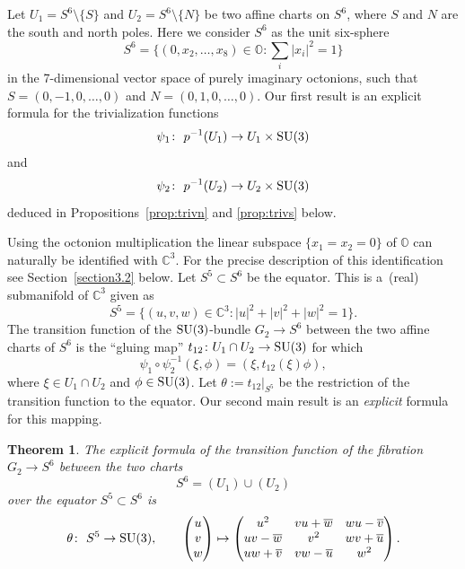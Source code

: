 \documentclass[pdftex]{sigma}
\numberwithin{equation}{section}
\newtheorem{Theorem}{Theorem}[section]
\begin{document}
Let $U_1 = S^6{\setminus}\{ S \}$ and $U_2 = S^6{\setminus}\{ N \}$ be two affine charts on $S^6$, where $S$ and $N$ are the south and north poles. Here we consider $S^6$ as the unit six-sphere
\[ S^6=\bigg\{(0,x_2,\dots,x_8) \in \mathbb{O}\colon \sum_i|x_i|^2=1 \bigg\}\]
in the 7-dimensional vector space of purely imaginary octonions, such that $S=(0,-1,0,\dots,0)$ and $N=(0,1,0,\dots,0)$. Our first result is
an explicit formula for the trivialization functions
\[ \psi_1 \colon \ p^{-1}(U_1) \rightarrow U_1 \times {\rm SU}(3) \]
and
\[ \psi_2 \colon \ p^{-1}(U_2) \rightarrow U_2 \times {\rm SU}(3) \]
deduced in Propositions~\ref{prop:trivn} and \ref{prop:trivs} below.

Using the octonion multiplication the linear subspace $\{x_1=x_2=0\}$ of $\mathbb{O}$ can naturally be identified with $\mathbb{C}^3$. For the precise description of this identification see Section~\ref{section3.2} below. Let $S^5 \subset S^6$ be the equator. This is a~(real) submanifold of $\mathbb{C}^3$ given as
\[ S^5=\big\{(u,v,w) \in \mathbb{C}^3 \colon |u|^2+|v|^2+|w|^2=1 \big\}.\]
The transition function of the ${\rm SU}(3)$-bundle $G_2 \rightarrow S^6$ between the two affine charts of $S^6$ is the ``gluing map'' $t_{12}\colon U_1 \cap U_2 \to {\rm SU}(3)$ for which
\[ \psi_1 \circ \psi_2^{-1}(\xi,\phi)=(\xi, t_{12}(\xi)\phi),\]
where $\xi \in U_1 \cap U_2$ and $\phi \in {\rm SU}(3)$.
Let $\theta:=t_{12}|_{S^5}$ be the restriction of the transition function to the equator. Our second main result is an \emph{explicit} formula for this mapping.
\begin{Theorem} \label{thm:trans}
 The explicit formula of the transition function of the fibration $G_2 \rightarrow S^6$ between the two charts
 \[S^6= ( U_1 ) \cup ( U_2 ) \]
 over the equator $S^5 \subset S^6$ is
 \begin{gather*}
 \theta\colon \ S^5 \rightarrow {\rm SU}(3), \qquad
 \begin{pmatrix}
 u\\ v\\ w
 \end{pmatrix}\mapsto
 \begin{pmatrix}
 u^2 & vu +\overline{w} &wu-\overline{v}\\
 uv-\overline{w} & v^2 & wv+\overline{u} \\
 uw+\overline{v}& vw-\overline{u} & w^2
 \end{pmatrix}.
 \end{gather*}
\end{Theorem}
\end{document}
